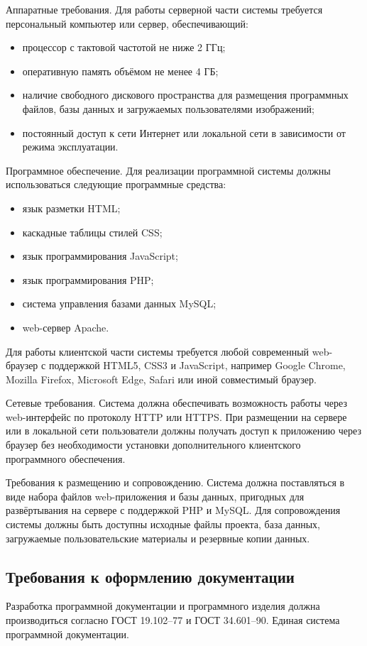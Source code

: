Аппаратные требования.  
Для работы серверной части системы требуется персональный компьютер или сервер, обеспечивающий:
\begin{itemize}
	\item процессор с тактовой частотой не ниже 2 ГГц;
	\item оперативную память объёмом не менее 4 ГБ;
	\item наличие свободного дискового пространства для размещения программных файлов, базы данных и загружаемых пользователями изображений;
	\item постоянный доступ к сети Интернет или локальной сети в зависимости от режима эксплуатации.
\end{itemize}

Программное обеспечение.  
Для реализации программной системы должны использоваться следующие программные средства:
\begin{itemize}
	\item язык разметки HTML;
	\item каскадные таблицы стилей CSS;
	\item язык программирования JavaScript;
	\item язык программирования PHP;
	\item система управления базами данных MySQL;
	\item web-сервер Apache.
\end{itemize}

Для работы клиентской части системы требуется любой современный web-браузер с поддержкой HTML5, CSS3 и JavaScript, например Google Chrome, Mozilla Firefox, Microsoft Edge, Safari или иной совместимый браузер.

Сетевые требования.  
Система должна обеспечивать возможность работы через web-интерфейс по протоколу HTTP или HTTPS. При размещении на сервере или в локальной сети пользователи должны получать доступ к приложению через браузер без необходимости установки дополнительного клиентского программного обеспечения.

Требования к размещению и сопровождению.  
Система должна поставляться в виде набора файлов web-приложения и базы данных, пригодных для развёртывания на сервере с поддержкой PHP и MySQL. Для сопровождения системы должны быть доступны исходные файлы проекта, база данных, загружаемые пользовательские материалы и резервные копии данных.

\subsection{Требования к оформлению документации}

Разработка программной документации и программного изделия должна производиться согласно ГОСТ 19.102--77 и ГОСТ 34.601--90. Единая система программной документации.